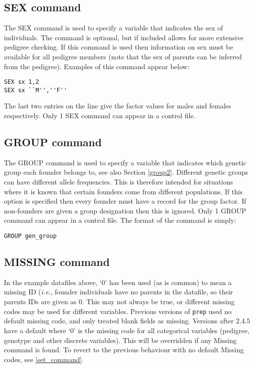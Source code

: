 \documentclass[10pt,a4paper]{article}
\newcommand{\IE}{\textit{i.e.},\xspace}
\newcommand{\Prep}{\texttt{prep}\xspace}
\begin{document}
\subsection{SEX command}\label{sex1}
The SEX command is used to specify a variable that indicates the sex of
individuals.  The command is optional, but if included allows for more
extensive pedigree checking.  If this command is used then information on
sex must be available for all pedigree members (note that the sex of parents
can be inferred from the pedigree).  Examples of this command appear below:
\begin{verbatim}
SEX sx 1,2
SEX sx ``M'',''F''
\end{verbatim}
The last two entries on the line give the factor values for males and
females respectively.  Only 1 SEX command can appear in a control file.
\subsection{GROUP command}\label{group1}
The GROUP command is used to specify a variable that indicates which genetic
group each founder belongs to, see also Section \ref{group2}.  Different
genetic groups can have different allele frequencies.  This is therefore
intended for situations where it is known that certain founders come from
different populations.  If this option is specified then every founder must
have a record for the group factor.  If non-founders are given a group
designation then this is ignored.  Only 1 GROUP command can appear in a
control file. The format of the command is simply:
\begin{verbatim}
GROUP gen_group
\end{verbatim}
\subsection{MISSING command}
In the example datafiles above, `0' has been used (as is common) to mean a
missing ID (\IE founder individuals have no parents in the datafile, so
their parents IDs are given as 0.  This may not always be true, or different
missing codes may be used for different variables.  Previous versions of
\Prep used no default missing code, and only treated blank fields as
missing.  Versions after 2.4.5 have a default where `0' is the missing code
for all categorical variables (pedigree, genotype and other discrete
variables).  This will be overridden if any Missing command is found.  To
revert to the previous behaviour with no default Missing codes, see
\ref{set_command}.
\end{document}
